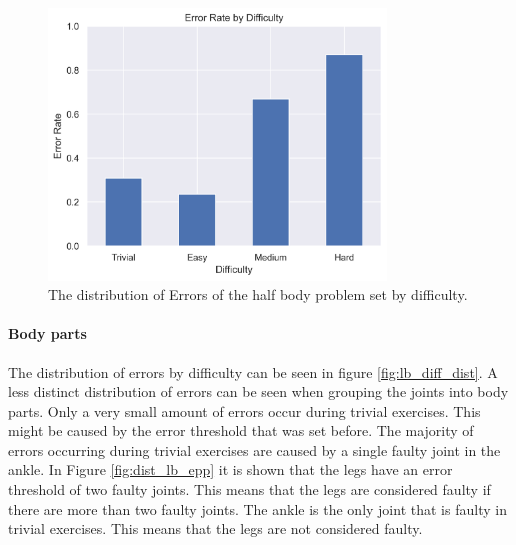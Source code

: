 \begin{figure}[ht]
  \centering
  \includegraphics[width=0.8\textwidth]{figures/Data/dist_half_body/Error_Rate_by_Difficulty.png}
  \caption[Error Distribution of the Half Body by difficulty]{The distribution of Errors of the half body problem set by difficulty.}
  \label{fig:hb_diff_dist}
\end{figure}

\paragraph{Body parts}

The distribution of errors by difficulty can be seen in figure \ref{fig:lb_diff_dist}. A less distinct distribution of errors can be seen when grouping the joints into body parts. Only a very small amount of errors occur during trivial exercises. This might be caused by the error threshold that was set before. The majority of errors occurring during trivial exercises are caused by a single faulty joint in the ankle. In Figure \ref{fig:dist_lb_epp} it is shown that the legs have an error threshold of two faulty joints. This means that the legs are considered faulty if there are more than two faulty joints. The ankle is the only joint that is faulty in trivial exercises. This means that the legs are not considered faulty.

